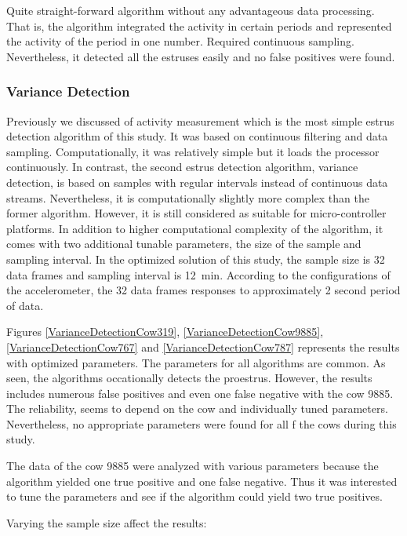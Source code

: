\documentclass[english,12pt,a4paper,pdftex,elec,utf8]{aaltothesis}
\begin{document}
Quite straight-forward algorithm without any advantageous data processing. That is, the algorithm integrated the activity in certain periods and represented the activity of the period in one number. Required continuous sampling. Nevertheless, it detected all the estruses easily and no false positives were found.


\subsubsection{Variance Detection} \label{variancedetectionevaluation}




Previously we discussed of activity measurement which is the most simple estrus detection algorithm of this study. It was based on continuous filtering and data sampling. Computationally, it was relatively simple but it loads the processor continuously. In contrast, the second estrus detection algorithm, variance detection, is based on samples with regular intervals instead of continuous data streams. Nevertheless, it is computationally slightly more complex than the former algorithm. However, it is still considered as suitable for micro-controller platforms. In addition to higher computational complexity of the algorithm, it comes with two additional tunable parameters, the size of the sample and sampling interval. In the optimized solution of this study, the sample size is 32 data frames and sampling interval is \SI{12}{\minute}. According to the configurations of the accelerometer, the 32 data frames responses to approximately 2 second period of data. 

Figures \ref{VarianceDetectionCow319}, \ref{VarianceDetectionCow9885}, \ref{VarianceDetectionCow767} and \ref{VarianceDetectionCow787} represents the results with optimized parameters. The parameters for all algorithms are common. As seen, the algorithms occationally detects the proestrus. However, the results includes numerous false positives and even one false negative with the cow 9885. The reliability, seems to depend on the cow and individually tuned parameters. Nevertheless, no appropriate parameters were found for all f the cows during this study.

The data of the cow 9885 were analyzed with various parameters because the algorithm yielded one true positive and one false negative. Thus it was interested to tune the parameters and see if the algorithm could yield two true positives.


Varying the sample size affect the results:
\end{document}
